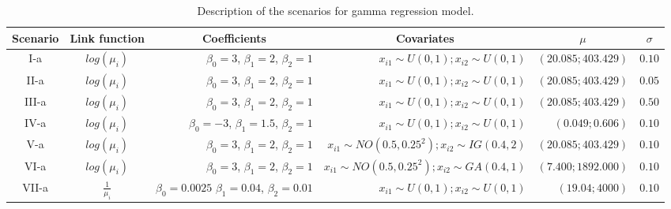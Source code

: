 \documentclass[11pt,authoryear,review,3p,times]{elsarticle}
\begin{document}
\begin{table}[htbp]
	\centering
	\scriptsize
	\caption{Description of the scenarios for gamma regression model.}
	\begin{tabular}{ccrrrr}
		\hline
		Scenario & \multicolumn{1}{c}{Link function} & \multicolumn{1}{c}{Coefficients} & \multicolumn{1}{c}{Covariates} &  \multicolumn{1}{c}{$\mu$} & \multicolumn{1}{c}{$\sigma$} \\
		\hline
		I-a   & $log(\mu_i)$ & $\beta_0 = 3$, $\beta_1 = 2$, $\beta_2 = 1$ & $x_{i1}\sim U(0,1); x_{i2}\sim U(0,1)$& $(20{.}085 ; 403{.}429)$ & $0{.}10$ \\
		II-a  & $log(\mu_i)$& $\beta_0 = 3$, $\beta_1 = 2$, $\beta_2 = 1$ & $x_{i1}\sim U(0,1); x_{i2}\sim U(0,1)$& $(20{.}085 ; 403{.}429)$ & $0{.}05$ \\
		III-a & $log(\mu_i)$& $\beta_0 = 3$, $\beta_1 = 2$, $\beta_2 = 1$ & $x_{i1}\sim U(0,1); x_{i2}\sim U(0,1)$& $(20{.}085 ; 403{.}429)$ & $0{.}50$ \\
		IV-a & $log(\mu_i)$ & $\beta_0 = -3$, $\beta_1 = 1{.}5$, $\beta_2 = 1$ & $x_{i1}\sim U(0,1); x_{i2}\sim U(0,1)$& $(0{.}049; 0{.}606)$ & $0{.}10$ \\
		V-a  & $log(\mu_i)$ & $\beta_0 = 3$, $\beta_1 = 2$, $\beta_2 = 1$ & $x_{i1}\sim NO(0.5,0.25^2); x_{i2}\sim IG(0.4,2)$& $(20{.}085 ; 403{.}429)$ & $0{.}10$ \\
		VI-a & $log(\mu_i)$ & $\beta_0 = 3$, $\beta_1 = 2$, $\beta_2 = 1$ & $x_{i1}\sim NO(0.5,0.25^2); x_{i2}\sim GA(0.4,1)$& $(7{.}400 ; 1892{.}000)$ & $0{.}10$ \\
		VII-a & $\frac{1}{\mu_i}$ & $\beta_0 =0{.}0025$ $\beta_1 = 0{.}04$, $\beta_2 = 0{.}01$ & $x_{i1}\sim U(0,1); x_{i2}\sim U(0,1)$& $(19{.}04 ; 4000)$ & $0{.}10$ \\
		\hline
	\end{tabular}%
	\label{tab:1}%
\end{table}%
\end{document}
